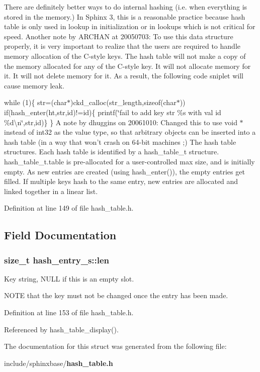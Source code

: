There are definitely better ways to do internal hashing (i.\-e. when everything is stored in the memory.) In Sphinx 3, this is a reasonable practice because hash table is only used in lookup in initialization or in lookups which is not critical for speed. Another note by A\-R\-C\-H\-A\-N at 20050703\-: To use this data structure properly, it is very important to realize that the users are required to handle memory allocation of the C-\/style keys. The hash table will not make a copy of the memory allocated for any of the C-\/style key. It will not allocate memory for it. It will not delete memory for it. As a result, the following code sniplet will cause memory leak.

while (1)\{ str=(char$\ast$)ckd\-\_\-calloc(str\-\_\-length,sizeof(char$\ast$)) if(hash\-\_\-enter(ht,str,id)!=id)\{ printf(\char`\"{}fail to add key str \%s with val id \%d\textbackslash{}n\char`\"{},str,id)\} \} A note by dhuggins on 20061010\-: Changed this to use void $\ast$ instead of int32 as the value type, so that arbitrary objects can be inserted into a hash table (in a way that won't crash on 64-\/bit machines ;) The hash table structures. Each hash table is identified by a hash\-\_\-table\-\_\-t structure. hash\-\_\-table\-\_\-t.\-table is pre-\/allocated for a user-\/controlled max size, and is initially empty. As new entries are created (using hash\-\_\-enter()), the empty entries get filled. If multiple keys hash to the same entry, new entries are allocated and linked together in a linear list. 

Definition at line 149 of file hash\-\_\-table.\-h.



\subsection{Field Documentation}
\subsubsection[{len}]{\setlength{\rightskip}{0pt plus 5cm}size\-\_\-t hash\-\_\-entry\-\_\-s\-::len}\label{structhash__entry__s_af1ec5f16059ced6d9a8ae4d36ca7e2b3}


Key string, N\-U\-L\-L if this is an empty slot. 

N\-O\-T\-E that the key must not be changed once the entry has been made. 

Definition at line 153 of file hash\-\_\-table.\-h.



Referenced by hash\-\_\-table\-\_\-display().



The documentation for this struct was generated from the following file\-:\begin{DoxyCompactItemize}
\item 
include/sphinxbase/{\bf hash\-\_\-table.\-h}\end{DoxyCompactItemize}
